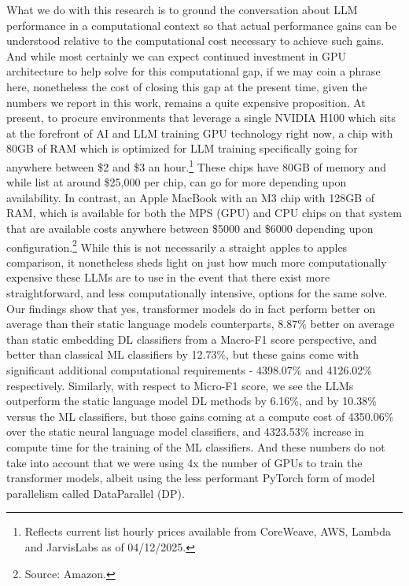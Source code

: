 \documentclass[final]{clv2025-revised}
\begin{document}
What we do with this research is to ground the conversation about LLM performance in a computational context so that actual performance gains can be understood relative to the computational cost necessary to achieve such gains. And while most certainly we can expect continued investment in GPU architecture to help solve for this computational gap, if we may coin a phrase here, nonetheless the cost of closing this gap at the present time, given the numbers we report in this work, remains a quite expensive proposition. At present, to procure environments that leverage a single NVIDIA H100 which sits at the forefront of AI and LLM training GPU technology right now, a chip with 80GB of RAM which is optimized for LLM training specifically going for anywhere between \$2 and \$3 an hour.\footnote{Reflects current list hourly prices available from CoreWeave, AWS, Lambda and JarvisLabs as of 04/12/2025.} These chips have 80GB of memory and while list at around \$25,000 per chip, can go for more depending upon availability. In contrast, an Apple MacBook with an M3 chip with 128GB of RAM, which is available for both the MPS (GPU) and CPU chips on that system that are available costs anywhere between \$5000 and \$6000 depending upon configuration.\footnote{Source: Amazon.} While this is not necessarily a straight apples to apples comparison, it nonetheless sheds light on just how much more computationally expensive these LLMs are to use in the event that there exist more straightforward, and less computationally intensive, options for the same solve. Our findings show that yes, transformer models do in fact perform better on average than their static language models counterparts, 8.87\% better on average than static embedding DL classifiers from a Macro-F1 score perspective, and better than classical ML classifiers by 12.73\%, but these gains come with significant additional computational requirements - 4398.07\% and 4126.02\% respectively. Similarly, with respect to Micro-F1 score, we see the LLMs outperform the static language model DL methods by 6.16\%, and by 10.38\% versus the ML classifiers, but those gains coming at a compute cost of 4350.06\% over the static neural language model classifiers, and 4323.53\% increase in compute time for the training of the ML classifiers. And these numbers do not take into account that we were using 4x the number of GPUs to train the transformer models, albeit using the less performant PyTorch form of model parallelism called DataParallel (DP).
\end{document}
